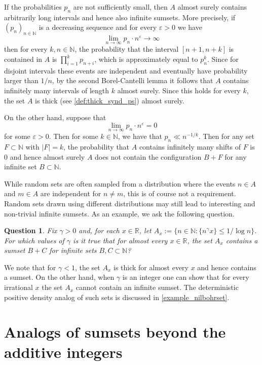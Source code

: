 \documentclass[10pt,dvipsnames]{article}
\newtheorem{question}[theorem]{Question}
\theoremstyle{definition}
\theoremstyle{plain}
\newcommand{\R}{\mathbb{R}}
\newcommand{\N}{\mathbb{N}}
\begin{document}
If the probabilities $p_n$ are not sufficiently small, then $A$ almost surely contains arbitrarily long intervals and hence also infinite sumsets.
More precisely, if $(p_n)_{n\in\N}$ is a decreasing sequence and for every $\varepsilon>0$ we have 
\[
\lim_{n\to\infty}p_n\cdot n^{\varepsilon}\to\infty
\]
then for every $k,n\in\N$, the probability that the interval $[n+1,n+k]$ is contained in $A$ is $\prod_{i=1}^kp_{n+i}$, which is approximately equal to $p_n^k$. Since for disjoint intervals these events are independent and eventually have probability larger than $1/n$, by the second Borel-Cantelli lemma it follows that $A$ contains infinitely many intervals of length $k$ almost surely.
Since this holds for every $k$, the set $A$ is thick (see \cref{def:thick_synd_ps}) almost surely.

On the other hand, suppose that
\[
\lim_{n\to\infty}p_n\cdot n^\varepsilon =  0
\]
for some $\varepsilon>0$.
Then for some $k\in\N$, we have that  $p_n\ll n^{-1/k}$.
Then for any set $F\subset\N$ with $|F|=k$, the probability that $A$ contains infinitely many shifts of $F$ is $0$ and hence almost surely $A$ does not contain the configuration $B+F$ for any infinite set $B\subset \N$.


While random sets are often sampled from a distribution where the events $n\in A$ and $m\in A$ are independent for $n\neq m$, this is of course not a requirement. 
Random sets drawn using different distributions may still lead to interesting and non-trivial infinite sumsets. 
As an example, we ask the following question.
\begin{question}
    Fix $\gamma>0$ and, for each $x\in\R$, let $A_x:=\{n\in\N:\{n^\gamma x\}\leq1/\log n\}$.
    For which values of $\gamma$ is it true that for almost every $x\in\R$, the set $A_x$ contains a sumset $B+C$ for infinite sets $B, C\subset\N$?
\end{question}
We note that for $\gamma<1$, the set $A_x$ is thick for almost every $x$ and hence contains a sumset. 
On the other hand, when $\gamma$ is an integer one can show that for every irrational $x$ the set $A_x$ cannot contain an infinite sumset. 
The deterministic positive density analog of such sets is discussed in \cref{example_nilbohrset}. 




\section{Analogs of sumsets beyond the additive integers}
\label{sec:semigroups}
\end{document}
